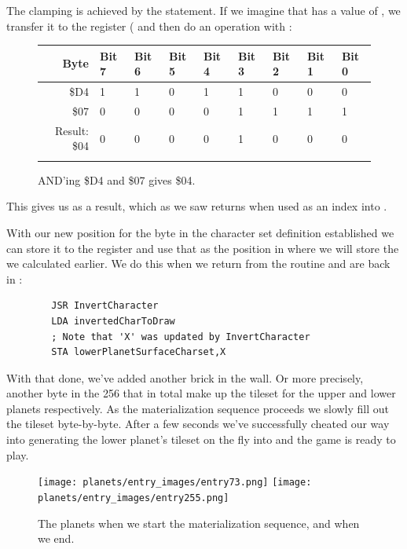 The clamping is achieved by the  statement. If we imagine that  has a value of
, we transfer it to the  register ( and then do an  operation
with :

\begin{figure}[H]
  {
    \setlength{\tabcolsep}{3.0pt}
    \setlength\cmidrulewidth{\heavyrulewidth} %
    \begin{adjustbox}{width=10cm,center}

      \begin{tabular}{rllllllll}
        \toprule
        Byte & Bit 7 & Bit 6 & Bit 5 & Bit 4 & Bit 3 & Bit 2 & Bit 1 & Bit 0        \\
        \midrule
        \$D4 & 1 & 1 & 0 & 1 & 1 & 0 & 0 & 0 \\
        \$07 & 0 & 0 & 0 & 0 & 1 & 1 & 1 & 1 \\
        \midrule
        Result: \$04 & 0 & 0 & 0 & 0 & 1 & 0 & 0 & 0 \\
        \addlinespace
        \bottomrule
      \end{tabular}

    \end{adjustbox}

  }\caption*{AND'ing \$D4 and \$07 gives \$04.}
\end{figure}

This gives us  as a result, which as we saw returns  when used as an index
into .

With our new position for the byte in the character set definition established we can store it to the
 register and use that as the position in  where we will
store the  we calculated earlier. We do this when we return from the
 routine and are back in :

\begin{lstlisting}
        JSR InvertCharacter
        LDA invertedCharToDraw
        ; Note that 'X' was updated by InvertCharacter
        STA lowerPlanetSurfaceCharset,X
\end{lstlisting}

With that done, we've added another brick in the wall. Or more precisely, another byte in the 
256 that in total make up the tileset for the upper and lower planets respectively. As the 
materialization sequence proceeds we slowly fill out the tileset byte-by-byte. After a few
seconds we've successfully cheated our way into generating the lower planet's tileset on the
fly into  and the game is ready to play.

\begin{figure}[H]
    \centering
      \texttt{[image: planets/entry\_images/entry73.png]}%
      \texttt{[image: planets/entry\_images/entry255.png]}%
\caption{The planets when we start the materialization sequence, and when we end.}
\end{figure}
